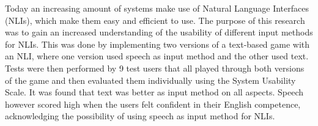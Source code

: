 Today an increasing amount of systems make use of Natural Language Interfaces (NLIs), which make them easy and efficient to use. The purpose of this research was to gain an increased understanding of the usability of different input methods for NLIs. This was done by implementing two versions of a text-based game with an NLI, where one version used speech as input method and the other used text. Tests were then performed by 9 test users that all played through both versions of the game and then evaluated them individually using the System Usability Scale. It was found that text was better as input method on all aspects. Speech however scored high when the users felt confident in their English competence, acknowledging the possibility of using speech as input method for NLIs.